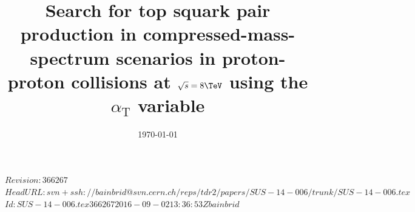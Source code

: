 \RCS$Revision: 366267 $
\RCS$HeadURL: svn+ssh://bainbrid@svn.cern.ch/reps/tdr2/papers/SUS-14-006/trunk/SUS-14-006.tex $
\RCS$Id: SUS-14-006.tex 366267 2016-09-02 13:36:53Z bainbrid $

\newlength\cmsFigWidth
{}

\newcommand{\cls}{\text{CL$_s$}\xspace}
\newcommand{\scalht}{\ensuremath{H_\text{T}}\xspace}
\newcommand{\HTmiss}{\ensuremath{H_\text{T}^\text{miss}}\xspace}
\newcommand{\dht}{\ensuremath{\Delta\scalht}\xspace}
\newcommand{\alphat}{\ensuremath{\alpha_\mathrm{T}}\xspace}
\newcommand{\njet}{\ensuremath{N_{\text{jet}}}\xspace}
\newcommand{\njetlow}{\ensuremath{2 \leq \njet \leq 3}\xspace}
\newcommand{\njethigh}{\ensuremath{\njet \geq 4}\xspace}
\newcommand{\nb}{\ensuremath{N_{\PQb}}\xspace}
\newcommand{\mj}{\ensuremath{\mu + \text{jets}}\xspace}
\newcommand{\mmj}{\ensuremath{\mu\mu + \text{jets}}\xspace}
\newcommand{\gj}{\ensuremath{\gamma + \text{jets}}\xspace}
\newcommand{\wjets}{\ensuremath{\PW + \text{jets}}\xspace}
\newcommand{\zjets}{\ensuremath{\cPZ + \text{jets}}\xspace}
\newcommand{\znunujets}{\ensuremath{\cPZ \to \cPgn\cPagn + \text{jets}}\xspace}
\newcommand{\znunu}{\ensuremath{\cPZ \to \cPgn\cPagn}\xspace}
\newcommand{\zmumujets}{\ensuremath{\cPZ \to \mu\mu + \text{jets}}\xspace}
\newcommand{\dphi}{\ensuremath{\Delta\phi^{*}_\text{min}}\xspace}
\newcommand{\dm}{\ensuremath{\Delta m}\xspace}
\newcommand{\alphatmin}{\ensuremath{\alphat^\text{min}}\xspace}
\newcommand{\mhtmet}{\ensuremath{\HTmiss / \ETmiss}\xspace}
\newcommand{\ffbp}{\ensuremath{f{\bar{f}'}}\xspace}


\title{Search for top squark pair production in
  compressed-mass-spectrum scenarios in proton-proton collisions at
  $\sqrt{s} = 8\TeV$ using the \alphat variable}

\date{\today}

